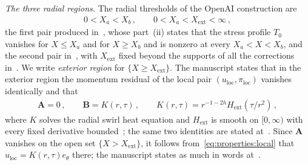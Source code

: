 \documentclass[11pt,reqno]{amsproc}
\numberwithin{equation}{section}
\theoremstyle{remark}
\begin{document}
\smallskip
\noindent\emph{The three radial regions.} The radial thresholds of the OpenAI construction are
\begin{align}
0<X_a<X_b
\,,\qquad
0<X_a<X_{\mathrm{ext}}<\infty
\,,
\label{eq:properties:regions}
\end{align}
the first pair produced in~\cite[Theorem~4.6, pp.~32--33]{OpenAIManuscript}, whose part~(ii) states that the stress profile $T_0$ vanishes for $X\le X_a$ and for $X\ge X_b$ and is nonzero at every $X_a<X<X_b$, and the second pair in~\cite[Theorem~3.1, p.~15]{OpenAIManuscript}, with $X_{\mathrm{ext}}$ fixed beyond the supports of all the corrections in~\cite[p.~116, Step~4]{OpenAIManuscript}. We write \emph{exterior region} for $\{X\ge X_{\mathrm{ext}}\}$. The manuscript states that in the exterior region the momentum residual of the local pair $(u_{\mathrm{loc}},\pi_{\mathrm{loc}})$ vanishes identically and that
\begin{align}
\mathbf A=0
\,,\qquad
\mathbf B=K(r,\tau)
\,,\qquad
K(r,\tau)=r^{-1-2h}H_{\mathrm{ext}}(\tau/r^2)
\,,
\label{eq:exterior:source:heat}
\end{align}
where $K$ solves the radial swirl heat equation and $H_{\mathrm{ext}}$ is smooth on $[0,\infty)$ with every fixed derivative bounded~\cite[equation~(3.5), p.~15]{OpenAIManuscript}; the same two identities are stated at~\cite[p.~116, Step~4]{OpenAIManuscript}. Since $\mathbf A$ vanishes on the open set $\{X>X_{\mathrm{ext}}\}$, it follows from~\eqref{eq:properties:local} that $u_{\mathrm{loc}}=K(r,\tau)e_\theta$ there; the manuscript states as much in words at~\cite[p.~119]{OpenAIManuscript}.
\end{document}
